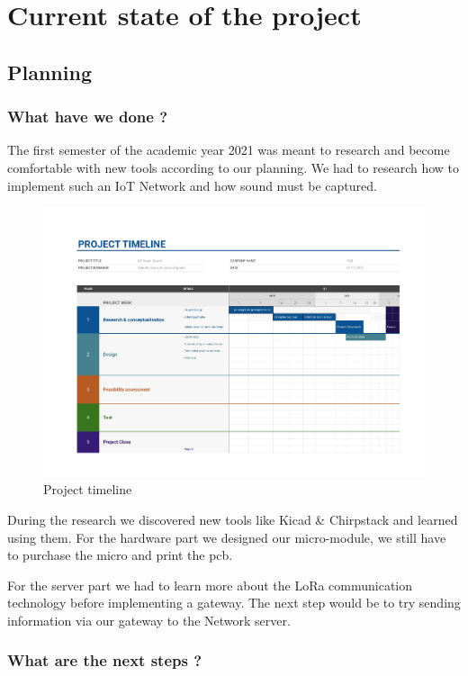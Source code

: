 \chapter{Current state of the project}\label{ch:state}

\section{Planning}
\subsection{What have we done ?}
The first semester of the academic year 2021 was meant to research and become comfortable with new tools according to our planning. We had to research how to implement such an IoT Network and how sound must be captured. 

\begin{figure}[hb]\centering
     \includegraphics[width=1\textwidth,height=1\textheight,keepaspectratio]{figs/timeline.jpg}
	\caption{Project timeline}\label{fig:planning}
\end{figure}

During the research we discovered new tools like Kicad \& Chirpstack and learned using them.
For the hardware part we designed our micro-module, we still have to purchase the micro and print the pcb.

For the server part we had to learn more about the LoRa communication technology before implementing a gateway. The next step would be to try sending information via our gateway to the Network server.

\subsection{What are the next steps ?}

